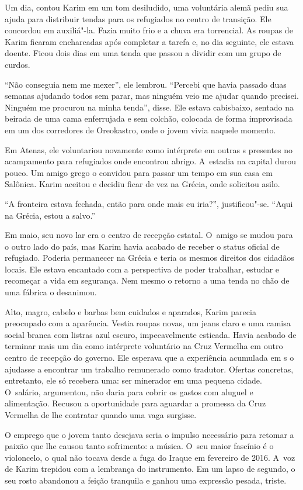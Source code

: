 Um dia, contou Karim em um tom desiludido, uma voluntária alemã pediu sua
ajuda para distribuir tendas para os refugiados no centro de transição.
Ele concordou em auxiliá"-la. Fazia muito frio e a chuva era torrencial.
As roupas de Karim ficaram encharcadas após completar a tarefa e, no dia
seguinte, ele estava doente. Ficou dois dias em uma tenda que passou a
dividir com um grupo de curdos.

``Não conseguia nem me mexer'', ele lembrou. ``Percebi que havia passado
duas semanas ajudando todos sem parar, mas ninguém veio me ajudar quando
precisei. Ninguém me procurou na minha tenda'', disse. Ele estava
cabisbaixo, sentado na beirada de uma cama enferrujada e sem colchão,
colocada de forma improvisada em um dos corredores de Oreokastro, onde o
jovem vivia naquele momento.

Em Atenas, ele voluntariou novamente como intérprete em outras s
presentes no acampamento para refugiados onde encontrou abrigo. A~estadia na capital durou pouco. Um amigo grego o convidou para passar um
tempo em sua casa em Salônica. Karim aceitou e decidiu ficar de vez na
Grécia, onde solicitou asilo.

``A fronteira estava fechada, então para onde mais eu iria?'',
justificou"-se. ``Aqui na Grécia, estou a salvo.''

Em maio, seu novo lar era o centro de recepção estatal. O~amigo se mudou
para o outro lado do país, mas Karim havia acabado de receber o status
oficial de refugiado. Poderia permanecer na Grécia e teria os mesmos
direitos dos cidadãos locais. Ele estava encantado com a perspectiva de
poder trabalhar, estudar e recomeçar a vida em segurança. Nem mesmo o
retorno a uma tenda no chão de uma fábrica o desanimou. 

Alto, magro, cabelo e barbas bem cuidados e aparados, Karim parecia
preocupado com a aparência. Vestia roupas novas, um jeans claro e uma
camisa social branca com listras azul escuro, impecavelmente esticada.
Havia acabado de terminar mais um dia como intérprete voluntário na Cruz
Vermelha em outro centro de recepção do governo. Ele esperava que a
experiência acumulada em s o ajudasse a encontrar um trabalho
remunerado como tradutor. Ofertas concretas, entretanto, ele só recebera
uma: ser minerador em uma pequena cidade. O~salário, argumentou, não
daria para cobrir os gastos com aluguel e alimentação. Recusou a
oportunidade para aguardar a promessa da Cruz Vermelha de lhe contratar
quando uma vaga surgisse.

O emprego que o jovem tanto desejava seria o impulso necessário para
retomar a paixão que lhe causou tanto sofrimento: a música. O~seu maior
fascínio é o violoncelo, o qual não tocava desde a fuga do Iraque em
fevereiro de 2016. A~voz de Karim trepidou com a lembrança do
instrumento. Em um lapso de segundo, o seu rosto abandonou a feição
tranquila e ganhou uma expressão pesada, triste.

